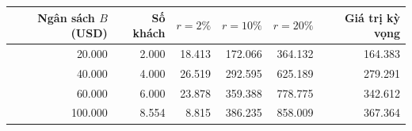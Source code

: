 \begin{tabular}{rrrrrr}
\toprule
Ngân sách $B$ (USD) & Số khách & $r=2\%$ & $r=10\%$ & $r=20\%$ & Giá trị kỳ vọng \\
\midrule
20.000 & 2.000 & 18.413 & 172.066 & 364.132 & 164.383 \\
40.000 & 4.000 & 26.519 & 292.595 & 625.189 & 279.291 \\
60.000 & 6.000 & 23.878 & 359.388 & 778.775 & 342.612 \\
100.000 & 8.554 & 8.815 & 386.235 & 858.009 & 367.364 \\
\bottomrule
\end{tabular}
